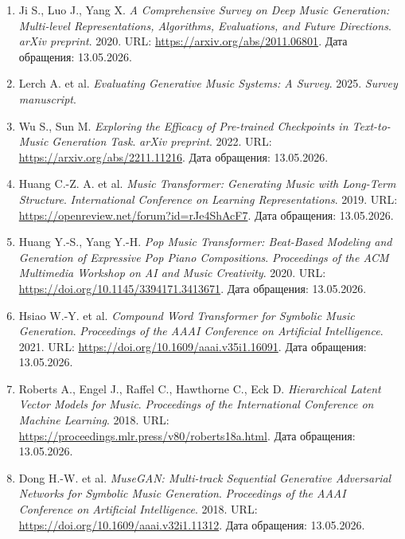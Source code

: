 \documentclass[a4paper,12pt]{extarticle}
\begin{document}
\begin{enumerate}
\item \label{ref:ji2020comprehensive} Ji S., Luo J., Yang X. \textit{A Comprehensive Survey on Deep Music Generation: Multi-level Representations, Algorithms, Evaluations, and Future Directions}. \textit{arXiv preprint}. 2020. URL: \url{https://arxiv.org/abs/2011.06801}. Дата обращения: 13.05.2026.

\item \label{ref:lerch2025-eval} Lerch A. et al. \textit{Evaluating Generative Music Systems: A Survey}. 2025. \textit{Survey manuscript}.


\item \label{ref:wu2022texttomusic} Wu S., Sun M. \textit{Exploring the Efficacy of Pre-trained Checkpoints in Text-to-Music Generation Task}. \textit{arXiv preprint}. 2022. URL: \url{https://arxiv.org/abs/2211.11216}. Дата обращения: 13.05.2026.

\item \label{ref:huang2018-music-transformer} Huang C.-Z. A. et al. \textit{Music Transformer: Generating Music with Long-Term Structure}. \textit{International Conference on Learning Representations}. 2019. URL: \url{https://openreview.net/forum?id=rJe4ShAcF7}. Дата обращения: 13.05.2026.

\item \label{ref:huangyang2020-remi} Huang Y.-S., Yang Y.-H. \textit{Pop Music Transformer: Beat-Based Modeling and Generation of Expressive Pop Piano Compositions}. \textit{Proceedings of the ACM Multimedia Workshop on AI and Music Creativity}. 2020. URL: \url{https://doi.org/10.1145/3394171.3413671}. Дата обращения: 13.05.2026.

\item \label{ref:hsiao2021-compound} Hsiao W.-Y. et al. \textit{Compound Word Transformer for Symbolic Music Generation}. \textit{Proceedings of the AAAI Conference on Artificial Intelligence}. 2021. URL: \url{https://doi.org/10.1609/aaai.v35i1.16091}. Дата обращения: 13.05.2026.

\item \label{ref:roberts2018-musicvae} Roberts A., Engel J., Raffel C., Hawthorne C., Eck D. \textit{Hierarchical Latent Vector Models for Music}. \textit{Proceedings of the International Conference on Machine Learning}. 2018. URL: \url{https://proceedings.mlr.press/v80/roberts18a.html}. Дата обращения: 13.05.2026.

\item \label{ref:dong2018-musegan} Dong H.-W. et al. \textit{MuseGAN: Multi-track Sequential Generative Adversarial Networks for Symbolic Music Generation}. \textit{Proceedings of the AAAI Conference on Artificial Intelligence}. 2018. URL: \url{https://doi.org/10.1609/aaai.v32i1.11312}. Дата обращения: 13.05.2026.


\end{enumerate}
\end{document}
